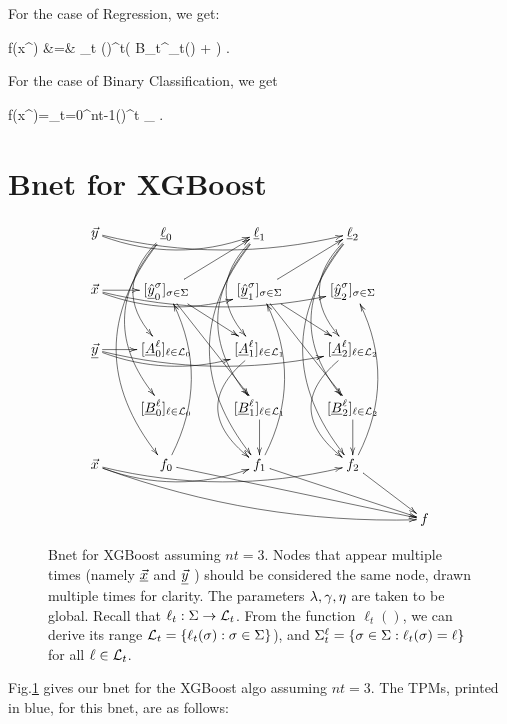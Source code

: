 For the case of Regression, we get:

\beqa
f(x^\s)
&=&
\sum_t (\eta)^t\left(
{B_t^{\ell_t(\s)} + \lam}
\right)
\;.
\eeqa

For the case of Binary Classification,
 we get

\beq
f(x^\s)=\sum_{t=0}^{nt-1}(\eta)^t
_{}
\;.
\eeq

\section{Bnet for XGBoost}




\begin{figure}[h!]
$$
\xymatrix{
\vec{y}\ar@/_1pc/[rr]\ar@/_1pc/[rrr]
&\ul{\ell}_0 \ar@/_2pc/[dd]\ar@/_2.5pc/[ddd]\ar@/_3pc/[dddd]
&\ul{\ell}_1 \ar@/_2pc/[dd]\ar@/_2.5pc/[ddd]\ar@/_3pc/[dddd]
&\ul{\ell}_2 \ar@/_2pc/[dd]\ar@/_2.5pc/[ddd]\ar@/_3pc/[dddd]
\\
\vec{x}\ar[r]\ar@/_1pc/[rr]\ar@/_1pc/[rrr]
&[\ul{\haty}^\s_0]_{\s\in\Sigma}\ar[rdd]
\ar[rd]\ar[ru]
&
[\ul{\haty}^\s_1]_{\s\in\Sigma}\ar[rdd]
\ar[rd]\ar[ru]
&
[\ul{\haty}^\s_2]_{\s\in\Sigma}
\\
\ul{\vecy}\ar[r]\ar@/_1pc/[rr]\ar@/_1pc/[rrr]
&[\ul{A}^\ell_0]_{\ell\in\call_0}
&
[\ul{A}^\ell_1]_{\ell\in\call_1}\ar@/_2.5pc/[dd]
&
[\ul{A}^\ell_2]_{\ell\in\call_2}\ar@/_2.5pc/[dd]
\\
&[\ul{B}^\ell_0]_{\ell\in\call_0}
&
[\ul{B}^\ell_1]_{\ell\in\call_1}\ar[d]
&
[\ul{B}^\ell_2]_{\ell\in\call_2}\ar[d]
\\
\vec{x}\ar@/_1pc/[drrrr]
\ar@/_1pc/[rr]\ar@/_1pc/[rrr]
&f_0\ar[drrr]\ar@/_1.5pc/[uuu]
&f_1\ar[drr]\ar@/_1.5pc/[uuu]
&f_2\ar[dr]\ar@/_1.5pc/[uuu]
\\
&&&&f
}$$
\caption{Bnet for XGBoost assuming $nt=3$. 
Nodes that appear
multiple
times (namely $\underline{{\vec{x}}}$ and $\underline{{\vec{y}}}$ )
should be considered the same node,
drawn multiple times for  clarity.
The parameters $\lambda, \gamma, \eta$ are 
taken to be global. Recall that
$\ell_t:\Sigma\rightarrow {\cal L}_t$.
From the function $\ell_t()$, we can derive
its range ${\cal L}_t=\{\ell_t(\sigma):\sigma\in\Sigma\}$),
and 
$\Sigma^\ell_t=\{\sigma\in\Sigma: \ell_t(\sigma)=\ell\}
$ for all $\ell\in {\cal L}_t$.}
\label{fig-xgb-bnet}
\end{figure}

Fig.\ref{fig-xgb-bnet}
gives our bnet for the XGBoost algo
assuming $nt=3$.
The TPMs, printed in blue,
for this bnet, are as follows:


